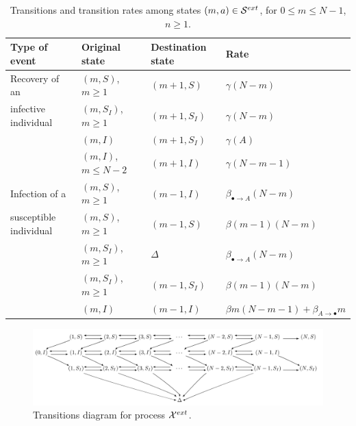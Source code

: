 \documentclass[preprint,12pt]{elsarticle}
\begin{document}
\begin{table}
\centering
\begin{tabular}{|l|l|l|l|}
\hline
Type of event & Original state & Destination state & Rate\\
\hline
Recovery of an & $(m,S)$, $m\geq1$ & $(m+1,S)$ & $\gamma(N-m)$\\
infective individual & $(m,S_I)$, $m\geq1$ & $(m+1,S_I)$ & $\gamma(N-m)$\\
 & $(m,I)$ & $(m+1,S_I)$ & $\gamma(A)$\\
 & $(m,I)$, $m\leq N-2$ & $(m+1,I)$ & $\gamma(N-m-1)$\\
\hline
Infection of a & $(m,S)$, $m\geq1$ & $(m-1,I)$ & $\beta_{\bullet\rightarrow A}(N-m)$\\
susceptible individual & $(m,S)$, $m\geq1$ & $(m-1,S)$ & $\beta(m-1)(N-m)$\\
 & $(m,S_I)$, $m\geq1$ & $\Delta$ & $\beta_{\bullet\rightarrow A}(N-m)$\\
 & $(m,S_I)$, $m\geq1$ & $(m-1,S_I)$ & $\beta(m-1)(N-m)$\\
 & $(m,I)$ & $(m-1,I)$ & $\beta m(N-m-1)+\beta_{A\rightarrow\bullet}m$\\
\hline
\end{tabular}
\caption{Transitions and transition rates among states $(m,a)\in{\cal S}^{ext}$, for $0\leq m\leq N-1$, $n\geq1$.}
\label{tab:1}
\end{table}

\begin{figure}
\includegraphics[width=\textwidth]{Figure3.jpg}
\caption{Transitions diagram for process ${\cal X}^{ext}$.}
\label{fig:3}
\end{figure}
\end{document}
